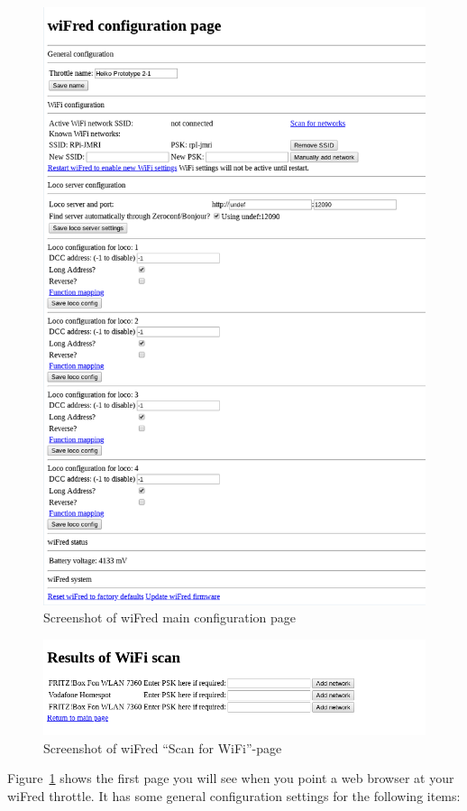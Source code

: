 \documentclass[11pt,a4paper]{scrartcl}
\begin{document}
\begin{figure}[tbhp]
  \centering
  \includegraphics[width=0.8 \textwidth]{images/wiFred_configuration_page}
  \caption{Screenshot of wiFred main configuration page}
  \label{throttleConfMainPage}
\end{figure}

\begin{figure}[tbh]
  \centering
  \includegraphics[width=0.8 \textwidth]{images/wiFred_wifi-scan_page}
  \caption{Screenshot of wiFred ``Scan for WiFi''-page}
  \label{throttleConfWiFiPage}
\end{figure}

Figure~\ref{throttleConfMainPage} shows the first page you will see when you point a web browser at your wiFred throttle. It has some general configuration settings for the following items:
\end{document}
